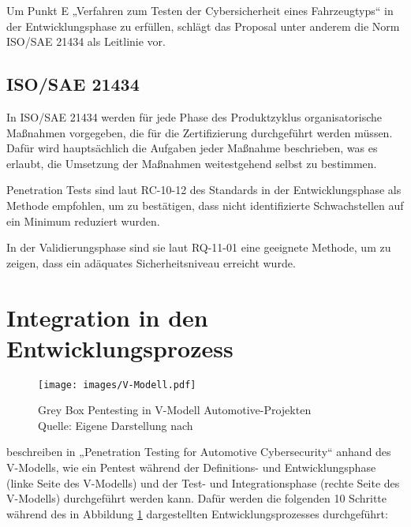 Um Punkt E „Verfahren zum Testen der Cybersicherheit eines Fahrzeugtyps“ in der Entwicklungsphase zu erfüllen, schlägt das Proposal unter anderem die Norm ISO/SAE 21434 als Leitlinie vor.
 
\subsection{ISO/SAE 21434}\label{subsec:iso21434}

In ISO/SAE 21434 werden für jede Phase des Produktzyklus organisatorische Maßnahmen vorgegeben, die für die Zertifizierung durchgeführt werden müssen. Dafür wird hauptsächlich die Aufgaben jeder Maßnahme beschrieben, was es erlaubt, die Umsetzung der Maßnahmen weitestgehend selbst zu bestimmen. 

Penetration Tests sind laut RC-10-12 des Standards in der Entwicklungsphase als Methode empfohlen, um zu bestätigen, dass nicht identifizierte Schwachstellen auf ein Minimum reduziert wurden.

In der Validierungsphase sind sie laut RQ-11-01 eine geeignete Methode, um zu zeigen, dass ein adäquates Sicherheitsniveau erreicht wurde.
 
\section{Integration in den Entwicklungsprozess}\label{fig:vmodell}

\begin{figure}[H]
	\centering
	\texttt{[image: images/V-Modell.pdf]}
	\caption{Grey Box Pentesting in V-Modell Automotive-Projekten \\ Quelle: Eigene Darstellung nach \cite[]{Ebert2021}}
	\label{fig:vmodel}
\end{figure}

\cite{Ebert2021} beschreiben in „Penetration Testing for Automotive Cybersecurity“ anhand des V-Modells, wie ein Pentest während der Definitions- und Entwicklungsphase (linke Seite des V-Modells) und der Test- und Integrationsphase (rechte Seite des V-Modells) durchgeführt werden kann. Dafür werden die folgenden 10 Schritte während des in Abbildung \ref{fig:vmodel} dargestellten Entwicklungsprozesses durchgeführt:

